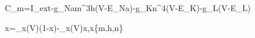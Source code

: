 C_m=I_{\rm ext}-\overline g_{Na}m^3h(V-E_{Na})-\overline g_Kn^4(V-E_K)-g_L(V-E_L)

\dot x=\alpha_x(V)(1-x)-\beta_x(V)x,\qquad x\in\{m,h,n\}
